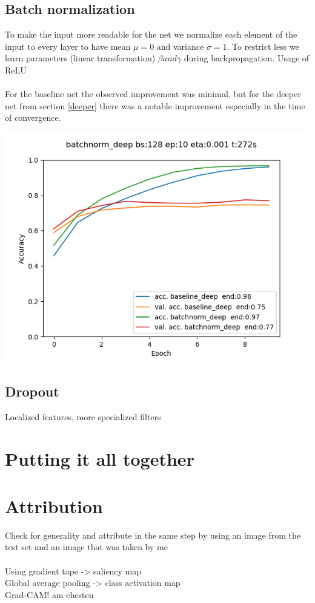 \documentclass{article}
\newenvironment{Figure}
{\par\medskip\noindent\minipage{\linewidth}}
{\endminipage\par\medskip}
\begin{document}
\begin{multicols}{2}
\subsection{Batch normalization}
To make the input more readable for the net we normalize each element of the input to every layer to have mean $\mu=0$ and variance $\sigma=1$. To restrict less we learn parameters (linear transformation) $\beta and \gamma$ during backpropagation. Usage of ReLU\\
\\
For the baseline net the observed improvement was minimal, but for the deeper net from section \ref{deeper} there was a notable improvement especially in the time of convergence.

\begin{Figure}
	\label{fig:batchnorm}
	\centering
	\includegraphics[width=\linewidth]{../img_1_5_regularization/batchnorm_deep}
\end{Figure}

\subsection{Dropout}
Localized features, more specialized filters

\section{Putting it all together}

\section{Attribution}

Check for generality and attribute in the same step by using an image from the test set and an image that was taken by me\\
\\
Using gradient tape -> saliency map\\
Global average pooling -> class activation map\\
Grad-CAM! am ehesten

\end{multicols}
\end{document}
